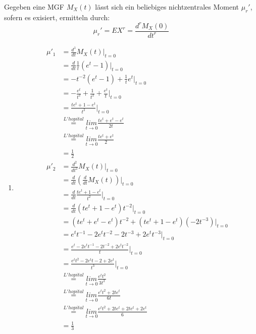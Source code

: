 \documentclass{article}
\begin{document}
Gegeben eine MGF $M_X(t)$ lässt sich ein beliebiges nichtzentrales Moment $\mu_r'$, sofern es exisiert, ermitteln durch: \[\mu_r' = E X^r = \frac{d^r M_X(0)}{dt^r}\]
\begin{enumerate}[label= zu \roman*)]
    \item 
        \begin{align*}
        \mu'_1 &= \frac{d^1}{dt} M_X(t) \bigg|_{t=0} \\
        &= \frac{d}{dt} \frac{1}{t}(e^t - 1)\bigg|_{t=0} \\
        &= -t^{-2}(e^t - 1) + \frac{1}{t}e^t  \bigg|_{t=0} \\
        &= -\frac{e^t}{t^2} + \frac{1}{t^2} + \frac{e^t}{t} \bigg|_{t=0} \\
        &= \frac{te^t + 1 - e^t}{t^2} \bigg|_{t=0} \\ 
        &\overset{L'hopital}{=} \underset{t \rightarrow 0}{lim} \frac{te^t + e^t - e^t}{2t} \\
        &\overset{L'hopital}{=} \underset{t \rightarrow 0}{lim} \frac{te^t + e^t}{2} \\
        &= \frac{1}{2} \\
        \mu'_2 &= \frac{d^2}{dt^2} M_X(t) \bigg|_{t=0} \\
        &= \frac{d}{dt} (\frac{d}{dt} M_X(t)) \bigg|_{t=0} \tag*{1. Ableitung von vorher} \\
        &= \frac{d}{dt} \frac{te^t + 1 - e^t}{t^2} \bigg|_{t=0} \\
        &= \frac{d}{dt} (te^t + 1 - e^t) t^{-2} \bigg|_{t=0} \\
        &= (te^t + e^t - e^t)t^{-2} +  (te^t + 1 - e^t)(-2t^{-3}) \bigg|_{t=0}\\
        &= e^t t^{-1} - 2e^t t^{-2} -2t^{-3} + 2e^tt^{-3} \bigg|_{t=0} \\
        &= \frac{e^t - 2e^t t^{-1} - 2t^{-2} + 2 e^tt^{-2}}{t} \bigg|_{t=0} \\
        &= \frac{e^t t^2 - 2e^t t - 2 + 2 e^t}{t^3} \bigg|_{t=0} \\
        & \overset{L'hopital}{=} \underset{t \rightarrow 0}{lim} \frac{e^t t^2}{3t^2}  \\
        & \overset{L'hopital}{=} \underset{t \rightarrow 0}{lim} \frac{e^t t^2 + 2t e^t}{6t}\\ 
        & \overset{L'hopital}{=} \underset{t \rightarrow 0}{lim} \frac{e^t t^2 + 2te^t + 2te^t + 2e^t}{6} \\
        & = \frac{1}{3}
        \end{align*}

\end{enumerate}
\end{document}

